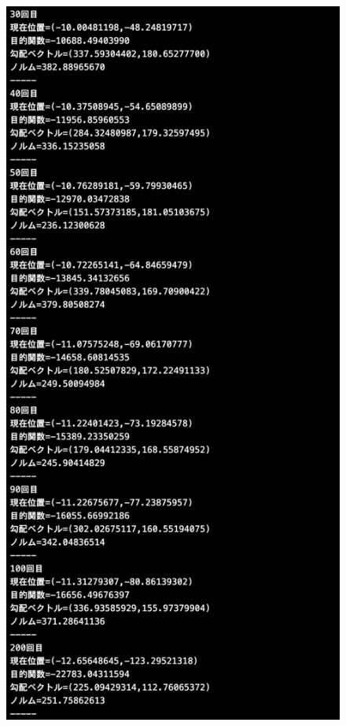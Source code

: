 \documentclass[12pt]{jarticle}
\begin{document}
\begin{figure}[h]
    \begin{minipage}{0.5\hsize}
        \begin{center}
            \includegraphics[scale=0.2]{kadai1_2s_out2_2_2.png}
        \end{center}

\end{minipage}
\end{figure}
\end{document}
